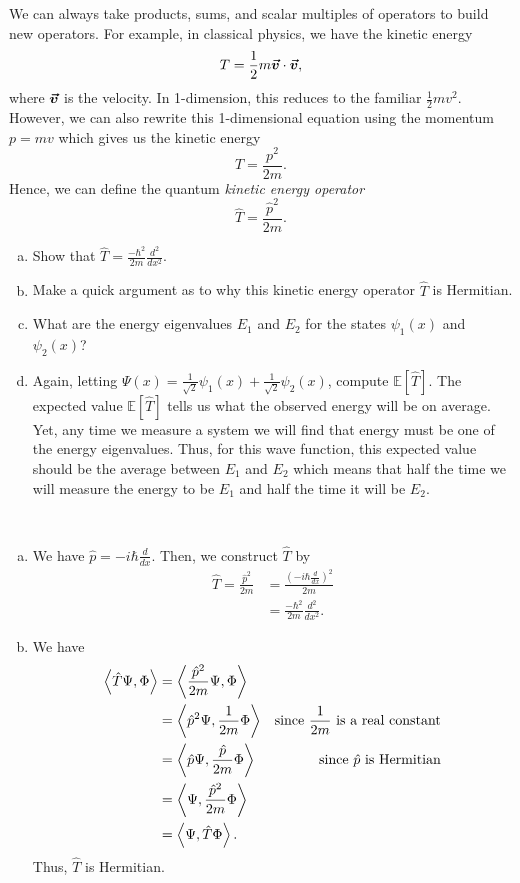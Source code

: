 \documentclass[12pt]{article} %
\begin{document}
\newpage
\begin{problem}
	We can always take products, sums, and scalar multiples of operators to build new operators.  For example, in classical physics, we have the kinetic energy
	\[
	T=\frac{1}{2}m \boldsymbol{\vec{v}} \cdot \boldsymbol{\vec{v}},
	\]
	where $\boldsymbol{\vec{v}}$ is the velocity. In 1-dimension, this reduces to the familiar $\frac{1}{2}mv^2$.  However, we can also rewrite this 1-dimensional equation using the momentum $p=mv$ which gives us the kinetic energy
	\[
	T=\frac{p^2}{2m}.
	\]
	Hence, we can define the quantum \emph{kinetic energy operator}
	\[
	\hat{T}=\frac{\hat{p}^2}{2m}.
	\]
	\begin{enumerate}[(a)]
		\item Show that $\hat{T} = \frac{-\hbar^2}{2m}\frac{d^2}{dx^2}$.
		\item Make a quick argument as to why this kinetic energy operator $\hat{T}$ is Hermitian.
		\item What are the energy eigenvalues $E_1$ and $E_2$ for the states $\psi_1(x)$ and $\psi_2(x)$?
		\item Again, letting $\Psi(x)=\frac{1}{\sqrt{2}}\psi_1(x)+\frac{1}{\sqrt{2}}\psi_2(x)$, compute $\mathbb{E}[\hat{T}]$. The expected value $\mathbb{E}[\hat{T}]$ tells us what the observed energy will be on average. Yet, any time we measure a system we will find that energy must be one of the energy eigenvalues. Thus, for this wave function, this expected value should be the average between $E_1$ and $E_2$ which means that half the time we will measure the energy to be $E_1$ and half the time it will be $E_2$.
	\end{enumerate}	
\end{problem}
\begin{solution}~
	\begin{enumerate}[(a)]
		\item We have $\hat{p}=-i\hbar \frac{d}{dx}$. Then, we construct $\hat{T}$ by
		\begin{align*}
		\hat{T}=\frac{\hat{p}^2}{2m} &= \frac{\left(-i\hbar \frac{d}{dx}\right)^2}{2m}\\
		&= \frac{-\hbar^2}{2m}\frac{d^2}{dx^2}.
		\end{align*}
		
		\item We have
		\begin{align*}
		\left\langle \hat{T}\Psi, \Phi \right\rangle &= \left\langle \frac{\hat{p}^2}{2m}\Psi, \Phi \right\rangle\\
		&= \left\langle \hat{p}^2 \Psi, \frac{1}{2m}\Phi \right\rangle &\textrm{since $\frac{1}{2m}$ is a real constant}\\
		&= \left\langle \hat{p}\Psi, \frac{\hat{p}}{2m} \Phi \right\rangle & \textrm{since $\hat{p}$ is Hermitian}\\
		&= \left\langle \Psi, \frac{\hat{p}^2}{2m} \Phi \right\rangle\\
		&= \left\langle \Psi, \hat{T}\Phi \right\rangle.
		\end{align*}
		Thus, $\hat{T}$ is Hermitian.
	\end{enumerate}
\end{solution}
\end{document}
